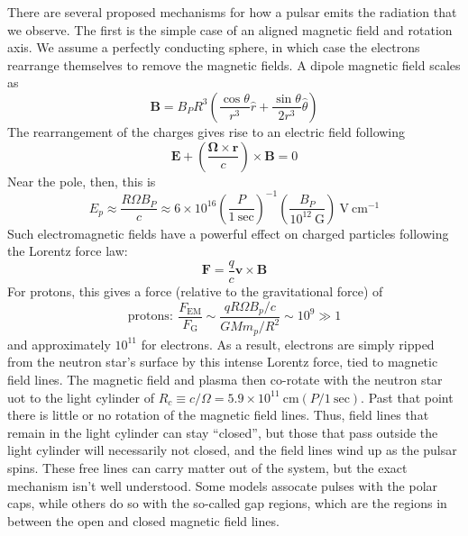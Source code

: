 \documentclass[10pt]{article}
\numberwithin{equation}{section}
\newcommand{\n}{\noindent}
\begin{document}
	\n There are several proposed mechanisms for how a pulsar emits the radiation that we observe. The first is the simple case of an aligned magnetic field and rotation axis. We assume a perfectly conducting sphere, in which case the electrons rearrange themselves to remove the magnetic fields. A dipole magnetic field scales as
	\begin{equation}
		\label{eq:pulsar:1} \mathbf{B} = B_P R^3\left(\frac{\cos\theta}{r^3}\hat{r} + \frac{\sin\theta}{2r^3} \hat{\theta}\right)
	\end{equation}
	The rearrangement of the charges gives rise to an electric field following
	\begin{equation}
		\label{eq:pulsar:2} \mathbf{E} + \left(\frac{\bm{\Omega}\times \mathbf{r}}{c}\right)\times \mathbf{B} = 0
	\end{equation}
	Near the pole, then, this is
	\begin{equation}
		\label{eq:pulsar:3} E_p \approx \frac{R\Omega B_P}{c} \approx 6\times 10^{16} \left(\frac{P}{1\ \mathrm{sec}}\right)^{-1}\left(\frac{B_P}{10^{12}\ \mathrm{G}}\right)\ \mathrm{V\ cm^{-1}}
	\end{equation}
	Such electromagnetic fields have a powerful effect on charged particles following the Lorentz force law:
	\begin{equation}
		\label{eq:pulsar:4} \mathbf{F} = \frac{q}{c}\mathbf{v}\times \mathbf{B}
	\end{equation}
	For protons, this gives a force (relative to the gravitational force) of
	\begin{equation}
		\label{eq:pulsar:5} \mathrm{protons:}\ \frac{F_{\mathrm{EM}}}{F_{\mathrm{G}}} \sim \frac{qR\Omega B_p/c}{G M m_p/R^2} \sim 10^9 \gg 1
	\end{equation}
	and approximately $10^{11}$ for electrons. As a result, electrons are simply ripped from the neutron star's surface by this intense Lorentz force, tied to magnetic field lines. The magnetic field and plasma then co-rotate with the neutron star uot to the light cylinder of $R_c \equiv c/\Omega = 5.9\times 10^{11}\ \mathrm{cm} (P/1\ \mathrm{sec})$. Past that point there is little or no rotation of the magnetic field lines. Thus, field lines that remain in the light cylinder can stay ``closed'', but those that pass outside the light cylinder will necessarily not closed, and the field lines wind up as the pulsar spins. These free lines can carry matter out of the system, but the exact mechanism isn't well understood. Some models assocate pulses with the polar caps, while others do so with the so-called gap regions, which are the regions in between the open and closed magnetic field lines.\\
	
\end{document}
